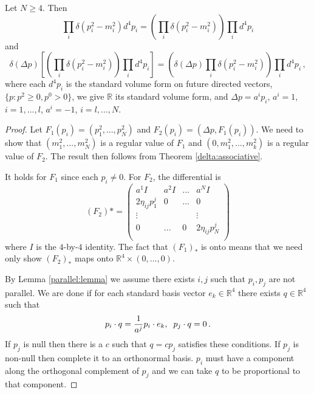 \begin{lemma}
Let $N\geq 4$. Then
\begin{equation}
\prod_i \delta(p_i^2-m_i^2)d^4p_i=\left(\prod_i \delta(p_i^2-m_i^2)\right)\prod_i d^4p_i
\end{equation}
 and 
\begin{equation}
\delta(\Delta p)\left[\left(\prod_i \delta(p_i^2-m_i^2)\right)\prod_i d^4p_i\right]=\left(\delta(\Delta p)\prod_i \delta(p_i^2-m_i^2)\right)\prod_i d^4p_i\,,
\end{equation}
where each $d^4p_i$ is the standard volume form on future directed vectors, $\{p:p^2\geq 0, p^0>0\}$, we give $\mathbb{R}$ its standard volume form, and $\Delta p=a^ip_i$, $a^i=1$, $i=1,...,l$, $a^i=-1$, $i=l,...,N$. 
\end{lemma}
\begin{proof}
Let $F_1(p_i)=(p_1^2,...,p_N^2)$ and $F_2(p_i)=(\Delta p,F_1(p_i))$.  We need to show that $(m_1^2,...,m_N^2)$ is a regular value of $F_1$ and $(0,m_1^2,...,m_k^2)$ is a regular value of $F_2$.  The result then follows from Theorem \ref{delta:associative}.

It holds for $F_1$ since each $p_i\neq 0$. For $F_2$, the differential is
\begin{equation}
(F_2)*=\left( \begin{array}{cccc}
a^{1}I&a^{2}I&...& a^{N}I \\
2 \eta_{ij}p^j_1&0&...&0\\
\vdots&&&\vdots\\
0&...&0&2 \eta_{ij}p^j_N\\
\end{array} \right)
\end{equation}
where $I$ is the $4$-by-$4$ identity.  The fact that $(F_1)_*$ is onto means that we need only show $(F_2)_*$ maps onto $\mathbb{R}^4\times(0,...,0)$.  

By Lemma \ref{parallel:lemma} we assume there exists $i,j$ such that $p_i,p_j$ are not parallel. We are done if for each standard basis vector $e_k\in\mathbb{R}^4$ there exists $q\in\mathbb{R}^4$ such that
\begin{equation}
p_i\cdot q=\frac{1}{a^j}p_i\cdot e_k,\hspace{2mm} p_j\cdot q=0\,.
\end{equation}
If $p_j$ is null then there is a $c$ such that $q=c p_j$ satisfies these conditions. If $p_j$ is non-null then complete it to an orthonormal basis.  $p_i$ must have a component along the orthogonal complement of $p_j$ and we can take $q$ to be proportional to that component.

\end{proof}



